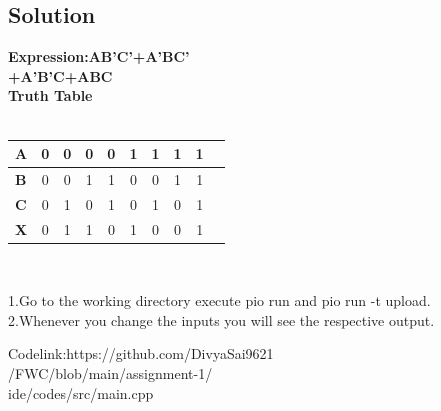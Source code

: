 \documentclass[10pt]{report}
\begin{document}
\begin{multicols}{2}
\section{Solution} 
\centering
\textbf{Expression:AB'C'+A'BC' \\ 
	+A'B'C+ABC}\\
\textbf{Truth Table}\\
\
\\\begin{tabular}{|l|c|c|c|c|c|c|c|c|c|}
\hline
\textbf{A} & 0 & 0 & 0 & 0 & 1 & 1 & 1 & 1\\
\hline
\textbf{B} & 0 & 0 & 1 & 1 & 0 & 0 & 1 & 1\\
\hline
\textbf{C} & 0 & 1 & 0 & 1 & 0 & 1 & 0 & 1\\
\hline
\textbf{X} & 0 & 1 & 1 & 0 & 1 & 0 & 0 & 1\\
\hline
\end{tabular}\\
\vspace{1cm}
\raggedright 1.Go to the working directory execute pio run and pio run -t upload.\\
2.Whenever you change the inputs you will see the respective output. \\
\vspace{1cm}
\raggedright Codelink:https://github.com/DivyaSai9621\\/FWC/blob/main/assignment-1/\\ ide/codes/src/main.cpp

\end{multicols}
\end{document}
